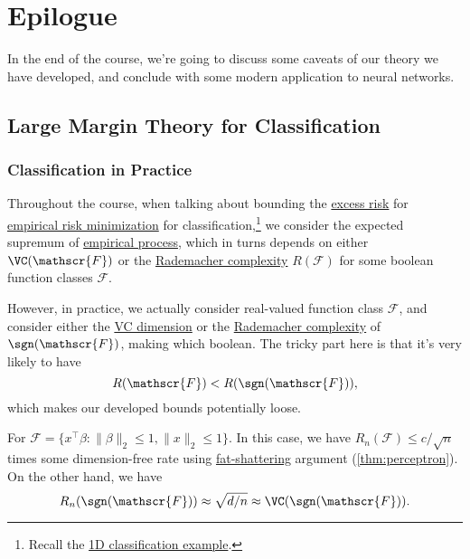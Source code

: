 \chapter{Epilogue}
In the end of the course, we're going to discuss some caveats of our theory we have developed, and conclude with some modern application to neural networks.

\section{Large Margin Theory for Classification}
\subsection{Classification in Practice}
Throughout the course, when talking about bounding the \hyperref[def:excess-risk]{excess risk} for \hyperref[prb:ERM]{empirical risk minimization} for classification,\footnote{Recall the \hyperref[eg:1D-classification-thresholds]{1D classification example}.} we consider the expected supremum of \hyperref[def:EP]{empirical process}, which in turns depends on either \(\VC(\mathscr{F} )\) or the \hyperref[def:Rademacher-complexity]{Rademacher complexity} \(R(\mathscr{F} )\) for some boolean function classes \(\mathscr{F} \).

However, in practice, we actually consider real-valued function class \(\mathscr{F} \), and consider either the \hyperref[def:VC-dimension]{VC dimension} or the \hyperref[def:Rademacher-complexity]{Rademacher complexity} of \(\sgn (\mathscr{F} )\), making which boolean. The tricky part here is that it's very likely to have
\[
	R(\mathscr{F} ) < R(\sgn (\mathscr{F} )),
\]
which makes our developed bounds potentially loose.

\begin{eg}
	For \(\mathscr{F} = \{ x^{\top} \beta \colon \lVert \beta \rVert _2 \leq 1, \lVert x \rVert _2 \leq 1 \} \). In this case, we have \(R_n(\mathscr{F} ) \leq c / \sqrt{n} \) times some dimension-free rate using \hyperref[def:fat-shattering-dimension]{fat-shattering} argument (\autoref{thm:perceptron}). On the other hand, we have
	\[
		R_n(\sgn (\mathscr{F} )) \approx \sqrt{d / n} \approx \VC(\sgn (\mathscr{F} )).
	\]
\end{eg}

